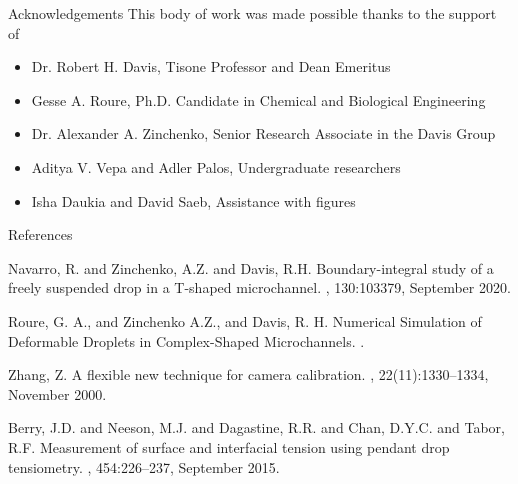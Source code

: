 \documentclass[final]{beamer}
\newlength{\colwidth}
\begin{document}
\begin{frame}[t]
\begin{columns}[t]
\begin{column}{\colwidth}
    \begin{block}{Acknowledgements}
    This body of work was made possible thanks to the support of
    \begin{itemize}
        \item Dr. Robert H. Davis, Tisone Professor and Dean Emeritus
        \item Gesse A. Roure, Ph.D. Candidate in Chemical and Biological Engineering
        \item Dr. Alexander A. Zinchenko, Senior Research Associate in the Davis Group
        \item Aditya V. Vepa and Adler Palos, Undergraduate researchers
        \item Isha Daukia and David Saeb, Assistance with figures
    \end{itemize}
    \end{block}

    \begin{block}{References}
        \small
        \begin{thebibliography}{9}
            Navarro, R. and Zinchenko, A.Z. and Davis, R.H.
            \newblock Boundary-integral study of a freely suspended drop in a {T}-shaped microchannel.
            , 130:103379, September 2020.

            Roure, G. A., and Zinchenko A.Z., and Davis, R. H.
            \newblock Numerical Simulation of Deformable Droplets in Complex-Shaped Microchannels.
            .
            
            
            Zhang, Z.
            \newblock A flexible new technique for camera calibration.
            , 22(11):1330--1334, November 2000.
            
            Berry, J.D. and Neeson, M.J. and Dagastine, R.R. and Chan, D.Y.C. and Tabor, R.F.
            \newblock Measurement of surface and interfacial tension using pendant drop tensiometry.
            , 454:226--237, September 2015.
            


\end{thebibliography}
\end{block}
\end{column}
\end{columns}
\end{frame}
\end{document}
